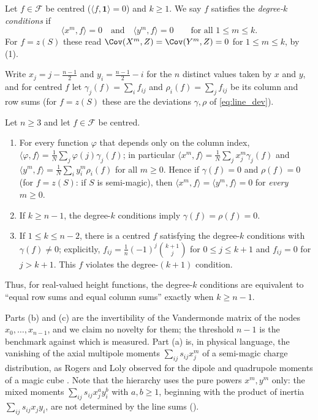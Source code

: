 \begin{definition}
\label{def:degree_k}
Let $f\in\mathcal F$ be centred ($\langle f,\mathbf 1\rangle=0$) and $k\ge1$.  We say $f$ satisfies the
\emph{degree-$k$ conditions} if
\[
\langle x^{m},f\rangle=0\quad\text{and}\quad\langle y^{m},f\rangle=0\qquad\text{for all }1\le m\le k .
\]
For $f=z(S)$ these read $\Cov(X^{m},Z)=\Cov(Y^{m},Z)=0$ for $1\le m\le k$, by (1).
\end{definition}

Write $x_j=j-\frac{n-1}2$ and $y_i=\frac{n-1}2-i$ for the $n$ distinct values taken by $x$ and $y$, and
for centred $f$ let $\gamma_j(f)=\sum_i f_{ij}$ and $\rho_i(f)=\sum_j f_{ij}$ be its column and row sums
(for $f=z(S)$ these are the deviations $\gamma,\rho$ of \eqref{eq:line_dev}).

\begin{proposition}
\label{prop:hierarchy}
Let $n\ge3$ and let $f\in\mathcal F$ be centred.
\begin{enumerate}
\item[(a)] For every function $\varphi$ that depends only on the column index, $\langle\varphi,f\rangle=\frac1N\sum_j\varphi(j)\gamma_j(f)$;
in particular $\langle x^{m},f\rangle=\frac1N\sum_j x_j^{m}\gamma_j(f)$ and $\langle y^{m},f\rangle=\frac1N\sum_i y_i^{m}\rho_i(f)$ for all $m\ge0$.
Hence if $\gamma(f)=0$ and $\rho(f)=0$ (for $f=z(S)$: if $S$ is semi-magic), then
$\langle x^{m},f\rangle=\langle y^{m},f\rangle=0$ for \emph{every} $m\ge0$.
\item[(b)] If $k\ge n-1$, the degree-$k$ conditions imply $\gamma(f)=\rho(f)=0$.
\item[(c)] If $1\le k\le n-2$, there is a centred $f$ satisfying the degree-$k$ conditions with $\gamma(f)\ne0$;
explicitly, $f_{ij}=\frac1n(-1)^{j}\binom{k+1}{j}$ for $0\le j\le k+1$ and $f_{ij}=0$ for $j>k+1$.
This $f$ violates the degree-$(k+1)$ condition.
\end{enumerate}
Thus, for real-valued height functions, the degree-$k$ conditions are equivalent to ``equal row sums and equal
column sums'' exactly when $k\ge n-1$.
\end{proposition}

Parts (b) and (c) are the invertibility of the Vandermonde matrix of the nodes $x_0,\dots,x_{n-1}$, and we claim no
novelty for them; the threshold $n-1$ is the benchmark against which  is measured.  Part (a) is,
in physical language, the vanishing of the axial multipole moments $\sum_{ij}s_{ij}x_j^{m}$ of a semi-magic charge
distribution, as Rogers and Loly observed for the dipole and quadrupole moments of a magic cube \cite{rogers2005multipole}.  Note that the hierarchy uses
the pure powers $x^{m},y^{m}$ only: the mixed moments $\sum_{ij}s_{ij}x_j^{a}y_i^{b}$ with $a,b\ge1$, beginning with the
product of inertia $\sum_{ij}s_{ij}x_jy_i$, are not determined by the line sums ().

